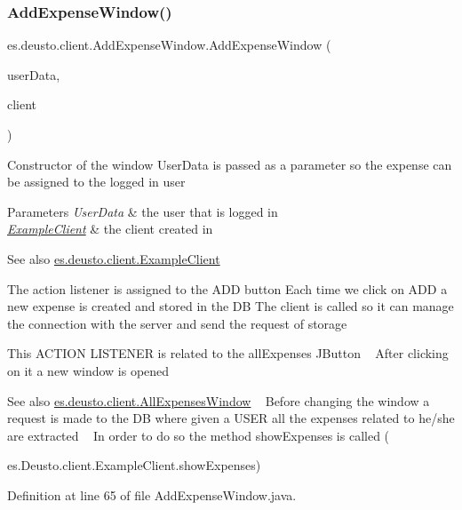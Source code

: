 \subsubsection{\texorpdfstring{Add\+Expense\+Window()}{AddExpenseWindow()}}
{\footnotesize\ttfamily es.\+deusto.\+client.\+Add\+Expense\+Window.\+Add\+Expense\+Window (\begin{DoxyParamCaption}\item[{\hyperlink{classes_1_1deusto_1_1serialization_1_1_user_data}{User\+Data}}]{user\+Data,  }\item[{\hyperlink{classes_1_1deusto_1_1client_1_1_example_client}{Example\+Client}}]{client }\end{DoxyParamCaption})}

Constructor of the window User\+Data is passed as a parameter so the expense can be assigned to the logged in user 
\begin{DoxyParams}{Parameters}
{\em User\+Data} & the user that is logged in \\
\hline
{\em \hyperlink{classes_1_1deusto_1_1client_1_1_example_client}{Example\+Client}} & the client created in \\
\hline
\end{DoxyParams}
\begin{DoxySeeAlso}{See also}
\hyperlink{classes_1_1deusto_1_1client_1_1_example_client}{es.\+deusto.\+client.\+Example\+Client} 
\end{DoxySeeAlso}
The action listener is assigned to the A\+DD button Each time we click on A\+DD a new expense is created and stored in the DB The client is called so it can manage the connection with the server and send the request of storage

This A\+C\+T\+I\+ON L\+I\+S\+T\+E\+N\+ER is related to the all\+Expenses J\+Button ~\newline
After clicking on it a new window is opened \begin{DoxySeeAlso}{See also}
\hyperlink{classes_1_1deusto_1_1client_1_1_all_expenses_window}{es.\+deusto.\+client.\+All\+Expenses\+Window} ~\newline
Before changing the window a request is made to the DB where given a U\+S\+ER all the expenses related to he/she are extracted ~\newline
In order to do so the method show\+Expenses is called (

es.\+Deusto.\+client.\+Example\+Client.\+show\+Expenses)
\end{DoxySeeAlso}


Definition at line 65 of file Add\+Expense\+Window.\+java.



